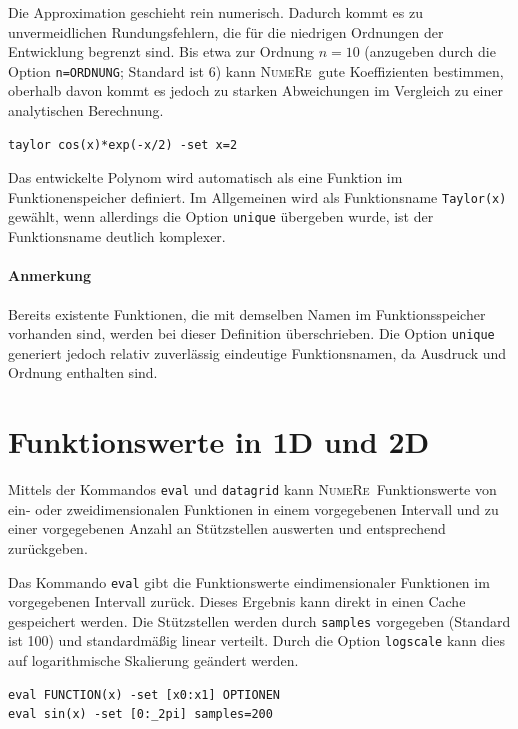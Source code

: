 \documentclass[DIV=14,headsepline,footsepline]{scrbook}
\newcommand{\NR}{\textsc{Nu\-me\-Re}}
\begin{document}
				Die Approximation geschieht rein numerisch. Dadurch kommt es zu unvermeidlichen Rundungsfehlern, die für die niedrigen Ordnungen der Entwicklung begrenzt sind. Bis etwa zur Ordnung $n = 10$ (anzugeben durch die Option \lstinline+n=ORDNUNG+; Standard ist 6) kann \NR\ gute Koeffizienten bestimmen, oberhalb davon kommt es jedoch zu starken Abweichungen im Vergleich zu einer analytischen Berechnung.
				\begin{lstlisting}
taylor cos(x)*exp(-x/2) -set x=2
				\end{lstlisting}
				
				Das entwickelte Polynom wird automatisch als eine Funktion im Funktionenspeicher definiert. Im Allgemeinen wird als Funktionsname \lstinline+Taylor(x)+ gewählt, wenn allerdings die Option \lstinline+unique+ übergeben wurde, ist der Funktionsname deutlich komplexer.
				\paragraph{Anmerkung}Bereits existente Funktionen, die mit demselben Namen im Funktionsspeicher vorhanden sind, werden bei dieser Definition überschrieben. Die Option \lstinline+unique+ generiert jedoch relativ zuverlässig eindeutige Funktionsnamen, da Ausdruck und Ordnung enthalten sind.
				
			\section{Funktionswerte in 1D und 2D} %
				Mittels der Kommandos \lstinline+eval+ und \lstinline+datagrid+ kann \NR\ Funktionswerte von ein- oder zweidimensionalen Funktionen in einem vorgegebenen Intervall und zu einer vorgegebenen Anzahl an Stützstellen auswerten und entsprechend zurückgeben.
				
				Das Kommando \lstinline+eval+ gibt die Funktionswerte eindimensionaler Funktionen im vorgegebenen Intervall zurück. Dieses Ergebnis kann direkt in einen Cache gespeichert werden. Die Stützstellen werden durch \lstinline+samples+ vorgegeben (Standard ist 100) und standardmäßig linear verteilt. Durch die Option \lstinline+logscale+ kann dies auf logarithmische Skalierung geändert werden.
				\begin{lstlisting}
eval FUNCTION(x) -set [x0:x1] OPTIONEN
eval sin(x) -set [0:_2pi] samples=200
				\end{lstlisting}
				
\end{document}
